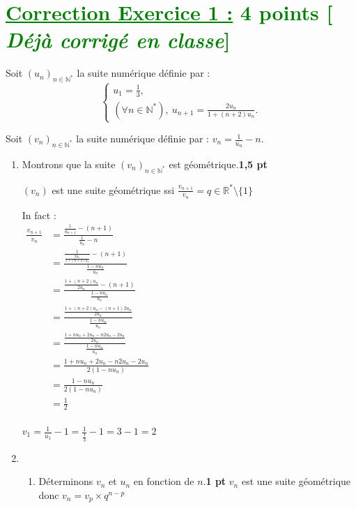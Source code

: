 \documentclass[12pt,a4paper]{article}
\begin{document}
\section*{\textcolor{green}{\underline{Correction Exercice 1 :} 4 points [\textit{ Déjà corrigé en classe}]}}
Soit \((u_n)_{n \in \mathbb{N}^*}\) la suite numérique définie par :
\[
\begin{cases}
u_1 = \frac{1}{3}, \\
(\forall n \in \mathbb{N}^*), \ u_{n+1} = \frac{2u_n}{1 + (n+2)u_n}.
\end{cases}
\]

Soit \((v_n)_{n \in \mathbb{N}^*}\) la suite numérique définie par : \(v_n = \frac{1}{u_n} - n\).

\begin{enumerate}
    \item Montrons que la suite \((v_n)_{n \in \mathbb{N}^*}\) est géométrique.\hfill \textbf{1,5 pt}
    
\((v_n)\) est une suite géométrique ssi $\frac{v_{n+1}}{v_n}=q \in \mathbb{R}^{*}\setminus\{1\}$

In fact : \\
$
\begin{aligned}
\frac{v_{n+1}}{v_n}&=\frac{\frac{1}{u_{n+1}} - (n+1)}{\frac{1}{u_n} - n}\\
									&=\frac{\frac{1}{\frac{2u_n}{1 + (n+2)u_n}} - (n+1)}{\frac{1 - nu_n}{u_n}}\\
									&=\frac{\frac{{1 + (n+2)u_n}}{2u_n} - (n+1)}{\frac{1 - nu_n}{u_n}}\\
									&=\frac{\frac{1 + (n+2)u_n - (n+1)2u_n}{2u_n}}{\frac{1 - nu_n}{u_n}}\\
									&=\frac{\frac{1 + nu_n+2u_n - n2u_n-2u_n}{2u_n}}{\frac{1 - nu_n}{u_n}}\\
									&=\frac{1 + nu_n+2u_n - n2u_n-2u_n}{2(1 - nu_n)}\\
									&=\frac{1 - nu_n}{2(1 - nu_n)}\\
									&=\frac{1}{2}\\
\end{aligned}
$

\( v_1 = \frac{1}{u_1} - 1=\frac{1}{\frac{1}{3}} - 1=3 - 1 =2 \)    
    \item 
    \begin{enumerate}
        \item Déterminons \(v_n\) et \(u_n\) en fonction de \(n\).\hfill \textbf{1 pt}
        \(v_n\) est une suite géométrique donc \(v_n=v_p \times q^{n-p}\)
    \end{enumerate}
\end{enumerate}
\end{document}
